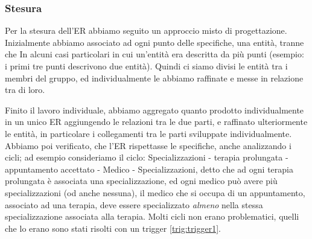 \documentclass[11pt]{article}
\begin{document}
\subsubsection{Stesura}
Per la stesura dell'ER abbiamo seguito un approccio misto di progettazione.
Inizialmente abbiamo associato ad ogni punto delle specifiche, una entità, tranne che In
alcuni casi particolari in cui un'entità era descritta da più punti (esempio: i primi tre punti
descrivono due entità). Quindi ci siamo divisi le entità tra i membri del gruppo, ed 
individualmente le abbiamo raffinate e messe in relazione tra di loro.

Finito il lavoro individuale, abbiamo aggregato quanto prodotto individualmente in un unico ER 
aggiungendo le relazioni tra le due parti, e raffinato ulteriormente le entità, in particolare
i collegamenti tra le parti sviluppate individualmente. Abbiamo poi verificato, che l'ER rispettasse le specifiche,
anche analizzando i cicli; ad esempio consideriamo il ciclo: Specializzazioni - terapia prolungata - appuntamento accettato 
- Medico - Specializzazioni, detto che ad ogni terapia prolungata è associata una specializzazione, ed ogni medico può avere più
specializzazioni (od anche nessuna), il medico che si occupa di un appuntamento, associato ad una terapia, deve essere specializzato
\emph{almeno} nella stessa specializzazione associata alla terapia. Molti cicli non erano problematici,
quelli che lo erano sono stati risolti con un trigger \ref{trig:trigger1}.
\end{document}
